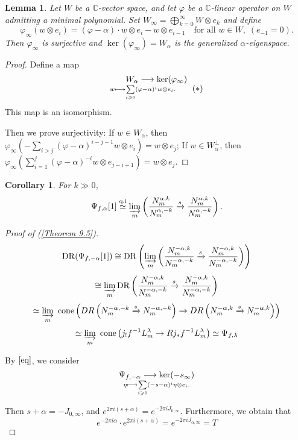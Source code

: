 \documentclass[openany]{book}
\newtheorem{lemma}[theorem]{Lemma}     %
\newtheorem{corollary}[theorem]{Corollary}   %
\theoremstyle{definition} %
\theoremstyle{remark}
\begin{document}
\begin{lemma}
    Let $W$ be a $\mathbb{C}$-vector space, and let $\varphi$ be a $\mathbb{C}$-linear operator on $W$ admitting a minimal polynomial.
    Set $W_{\infty} = \bigoplus_{k=0}^{\infty} W \otimes e_k$ and define $$\varphi_{\infty}(w \otimes e_i) = (\varphi - \alpha) \cdot w \otimes e_i - w \otimes e_{i-1} \quad \text{for all }  w \in W, \; (e_{-1} = 0).$$Then $\varphi_{\infty}$ is surjective and $\ker(\varphi_{\infty}) = W_{\alpha}$ is the generalized $\alpha$-eigenspace.
\end{lemma}
\begin{proof}
    Define a map
    \begin{equation}
        W_{\alpha} \longrightarrow \ker(\varphi_{\infty})\atop w \longmapsto \sum\limits_{i \geqslant 0} (\varphi - \alpha)^i w \otimes e_{i}.
        \tag{$\ast$}
        \label{eq}
    \end{equation}
    This map is an isomorphism.

    Then we prove surjectivity: If $w\in W_{\alpha}$, then $\varphi_{\infty}( -\sum\limits_{i>j} (\varphi-\alpha)^{i-j-1}w\otimes e_{i})=w\otimes e_{j}$; If $w\in W_{\alpha}^{\perp}$, then $\varphi_{\infty}( \sum\limits_{i=1}^{j}(\varphi-\alpha)^{-i}w\otimes e_{j-i+1} )=w\otimes e_{j}$.
\end{proof}
\begin{corollary}
    For $k \gg 0$, $$
        \Psi_{f,\alpha}[1] \stackrel{\text{q.i}}{\simeq}\varinjlim_m \left( \frac{N_m^{\alpha,k}}{N_m^{\alpha,-k}} \xrightarrow{s} \frac{N_m^{\alpha,k}}{N_m^{\alpha,-k}} \right).
    $$
\end{corollary}

\begin{proof}[Proof of  (\ref{Theorem 9.5})]
    $$
        \mathrm{DR}(\Psi_{f,-\alpha}[1]) \cong \mathrm{DR}\left( \varinjlim_m  \left( \frac{N_m^{-\alpha,k}}{N_m^{-\alpha,-k}} \xrightarrow{s} \frac{N_m^{-\alpha,k}}{N_m^{-\alpha,-k}} \right) \right)$$
    $$ \cong \varinjlim_m  \mathrm{DR}\left( \frac{N_m^{-\alpha,k}}{N_m^{-\alpha,-k}} \xrightarrow{s} \frac{N_m^{-\alpha,k}}{N_m^{-\alpha,-k}} \right)$$
    $$\simeq \varinjlim_m\ \text{cone}\left( DR\left(N_{m}^{-\alpha,-k} \xrightarrow{s} N_m^{-\alpha,-k}\right) \rightarrow DR\left(N_m^{-\alpha,k} \xrightarrow{s} N_m^{-\alpha,k}\right)\right)$$
    $$\simeq\varinjlim_m\ \text{cone}\left(j_! f^{-1} L_m^{\lambda} \rightarrow R j_* f^{-1} L_m^{\lambda}\right)\simeq \Psi_{f,\lambda}$$

    By $\eqref{eq}$, we consider $$   \Psi_{f,-\alpha} \longrightarrow \ker(-s_{\infty})\atop \eta \longmapsto \sum\limits_{i \geqslant 0} (-s-\alpha)^i \eta\otimes  e_{i}.$$

    Then $s+\alpha = -J_{0,\infty}$, and $e^{2\pi i(s+\alpha)} = e^{-2\pi i J_{0,\infty}}$. Furthermore, we obtain that $$e^{-2\pi i\alpha} \cdot e^{2\pi i(s+\alpha)} = e^{-2\pi i J_{\alpha,\infty}} = T$$
\end{proof}
\end{document}
